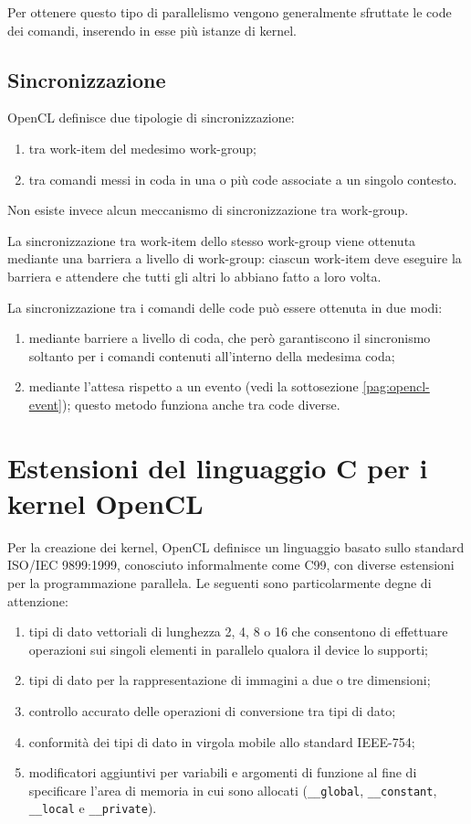 \documentclass[12pt,a4paper,oneside]{book}
\begin{document}
Per ottenere questo tipo di parallelismo vengono generalmente sfruttate le code dei comandi, inserendo in esse più istanze di kernel.

\subsection{Sincronizzazione}

\ac{OpenCL} definisce due tipologie di sincronizzazione:
\begin{enumerate}
\item tra work-item del medesimo work-group;
\item tra comandi messi in coda in una o più code associate a un singolo contesto.
\end{enumerate}

Non esiste invece alcun meccanismo di sincronizzazione tra work-group.

La sincronizzazione tra work-item dello stesso work-group viene ottenuta mediante una barriera a livello di work-group: ciascun work-item deve eseguire la barriera e attendere che tutti gli altri lo abbiano fatto a loro volta.

La sincronizzazione tra i comandi delle code può essere ottenuta in due modi:
\begin{enumerate}
\item mediante barriere a livello di coda, che però garantiscono il sincronismo soltanto per i comandi contenuti all'interno della medesima coda;
\item mediante l'attesa rispetto a un evento (vedi la sottosezione \ref{pag:opencl-event}); questo metodo funziona anche tra code diverse.
\end{enumerate}

\section{Estensioni del linguaggio C per i kernel OpenCL}
\label{sec:opencl-c99}

Per la creazione dei kernel, \ac{OpenCL} definisce un linguaggio basato sullo standard ISO/IEC 9899:1999, conosciuto informalmente come C99, con diverse estensioni per la programmazione parallela. Le seguenti sono particolarmente degne di attenzione: 
\begin{enumerate}
\item tipi di dato vettoriali di lunghezza 2, 4, 8 o 16 che consentono di effettuare operazioni sui singoli elementi in parallelo qualora il device lo supporti;
\item tipi di dato per la rappresentazione di immagini a due o tre dimensioni;
\item controllo accurato delle operazioni di conversione tra tipi di dato;
\item conformità dei tipi di dato in virgola mobile allo standard IEEE-754;
\item modificatori aggiuntivi per variabili e argomenti di funzione al fine di specificare l'area di memoria in cui sono allocati (\verb|__global|, \verb|__constant|, \verb|__local| e \verb|__private|).
\end{enumerate}
\end{document}
